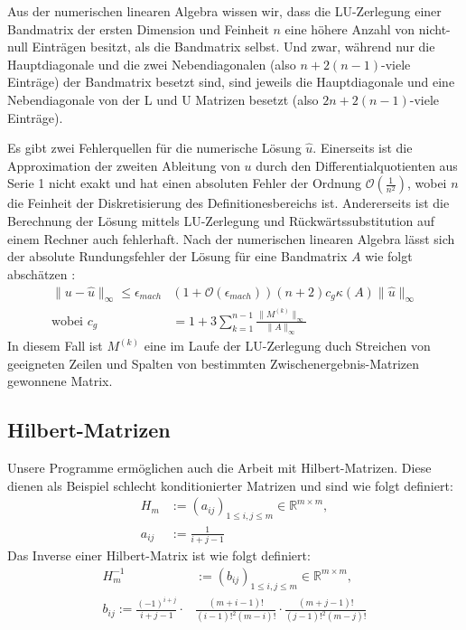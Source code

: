 \documentclass[smallheadings]{scrartcl}
\numberwithin{equation}{section}
\begin{document}
Aus der numerischen linearen Algebra wissen wir, dass die LU-Zerlegung einer Bandmatrix der ersten Dimension und Feinheit $n$ eine höhere Anzahl von nicht-null Einträgen besitzt, als die Bandmatrix selbst. Und zwar, während nur die Hauptdiagonale und die zwei Nebendiagonalen (also $n+2(n-1)$-viele Einträge) der Bandmatrix besetzt sind, sind jeweils die Hauptdiagonale und eine Nebendiagonale von der L und U Matrizen besetzt (also $2n+2(n-1)$-viele Einträge).

Es gibt zwei Fehlerquellen für die numerische Lösung $\hat{u}$. Einerseits ist die Approximation der zweiten Ableitung von $u$ durch den Differentialquotienten aus Serie 1 nicht exakt und hat einen absoluten Fehler der Ordnung $\mathcal{O}(\frac{1}{n^2})$, wobei $n$ die Feinheit der Diskretisierung des Definitionesbereichs ist. Andererseits ist die Berechnung der Lösung mittels LU-Zerlegung und Rückwärtssubstitution auf einem Rechner auch fehlerhaft. Nach der numerischen linearen Algebra lässt sich der absolute Rundungsfehler der Lösung für eine Bandmatrix $A$ wie folgt abschätzen \cite{nla}:
\begin{align}
\|u-\hat{u}\|_{\infty}\le \epsilon_{mach}&(1+\mathcal{O}(\epsilon_{mach}))(n+2)c_g\kappa(A)\|\hat{u}\|_{\infty} \\
\text{wobei } c_g&=1+3\sum_{k=1}^{n-1}\frac{\|M^{(k)}\|_{\infty}}{\|A\|_{\infty}}
\end{align}
In diesem Fall ist $M^{(k)}$ eine im Laufe der LU-Zerlegung duch Streichen von geeigneten Zeilen und Spalten von bestimmten Zwischenergebnis-Matrizen gewonnene Matrix.

\subsection{Hilbert-Matrizen}
Unsere Programme ermöglichen auch die Arbeit mit Hilbert-Matrizen. Diese dienen als Beispiel schlecht konditionierter Matrizen und sind wie folgt definiert:
\begin{align}
	H_m &:= (a_{ij})_{1\le i, j \le m} \in \mathbb{R}^{m\times m}, 	\\
	a_{ij} &:= \frac{1}{i+j-1} \label{eq:hb1}
\end{align}
Das Inverse einer Hilbert-Matrix ist wie folgt definiert:
\begin{align}
	H_m^{-1}& := (b_{ij})_{1\le i, j \le m} \in \mathbb{R}^{m\times m},	\\
	b_{ij} := \frac{(-1)^{i+j}}{i+j-1}\cdot &\frac{(m+i-1)!}{(i-1)!^2(m-i)!}\cdot \frac{(m+j-1)!}{(j-1)!^2(m-j)!}
\end{align}
\end{document}
